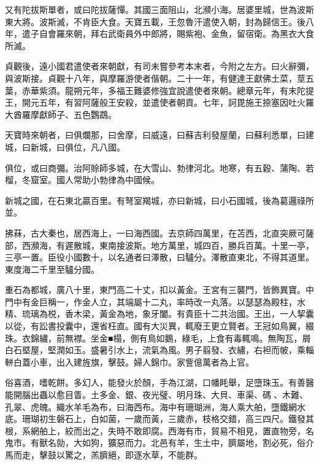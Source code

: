 \begin{pinyinscope}
 又有陀拔斯單者，或曰陀拔薩憚。其國三面阻山，北瀕小海。居婆里城，世為波斯東大將。波斯滅，不肯臣大食。天寶五載，王忽魯汗遣使入朝，封為歸信王。後八年，遣子自會羅來朝，拜右武衛員外中郎將，賜紫袍、金魚，留宿衛。為黑衣大食所滅。



 貞觀後，遠小國君遣使者來朝獻，有司未嘗參考本末者，今附之左方。曰火辭彌，與波斯接。貞觀十八年，與摩羅游使者偕朝。二十一年，有健達王獻佛土菜，莖五葉，赤華紫須。龍朔元年，多福王難婆修強宜說遣使者來朝。總章元年，有末陀提王，開元五年，有習阿薩般王安殺，並遣使者朝貢。七年，訶毘施王捺塞因吐火羅大酋羅摩獻師子、五色鸚鵡。



 天寶時來朝者，曰俱爛那，曰舍摩，曰威遠，曰蘇吉利發屋蘭，曰蘇利悉單，曰建城，曰新城，曰俱位，凡八國。



 俱位，或曰商彌。治阿賒師多城，在大雪山、勃律河北。地寒，有五穀、蒲陶、若榴，冬窟室。國人常助小勃律為中國候。



 新城之國，在石東北贏百里。有弩室羯城，亦曰新城，曰小石國城，後為葛邏祿所並。



 拂菻，古大秦也，居西海上，一曰海西國。去京師四萬里，在苫西，北直突厥可薩部，西瀕海，有遲散城，東南接波斯。地方萬里，城四百，勝兵百萬。十里一亭，三亭一置。臣役小國數十，以名通者曰澤散，曰驢分。澤散直東北，不得其道里。東度海二千里至驢分國。



 重石為都城，廣八十里，東門高二十丈，扣以黃金。王宮有三襲門，皆飾異寶。中門中有金巨稱一，作金人立，其端屬十二丸，率時改一丸落。以瑟瑟為殿柱，水精、琉璃為棁，香木梁，黃金為地，象牙闔。有貴臣十二共治國。王出，一人挈囊以從，有訟書投囊中，還省枉直。國有大災異，輒廢王更立賢者。王冠如鳥翼，綴珠。衣錦繡，前無襟。坐金■榻，側有鳥如鵝，綠毛，上食有毒輒鳴。無陶瓦，屑白石塈屋，堅潤如玉。盛暑引水上，流氣為風。男子翦發、衣繡，右袒而帔，乘輜軿白蓋小車，出入建旌旗，擊鼓。婦人錦巾。家訾億萬者為上官。



 俗喜酒，嗜乾餅。多幻人，能發火於顏，手為江湖，口幡眊舉，足墮珠玉。有善醫能開腦出蟲以愈目眚。土多金、銀、夜光璧、明月珠、大貝、車渠、碼、木難、孔翠、虎魄。織水羊毛為布，曰海西布。海中有珊瑚洲，海人乘大舶，墮鐵網水底。珊瑚初生磐石上，白如菌，一歲而黃，三歲赤，枝格交錯，高三四尺。鐵發其根，系網舶上，絞而出之，失時不敢即腐。西海有市，貿易不相見，置直物旁，名鬼市。有獸名勍，大如狗，獷惡而力。北邑有羊，生土中，臍屬地，割必死，俗介馬而走，擊鼓以驚之，羔臍絕，即逐水草，不能群。




\end{pinyinscope}
